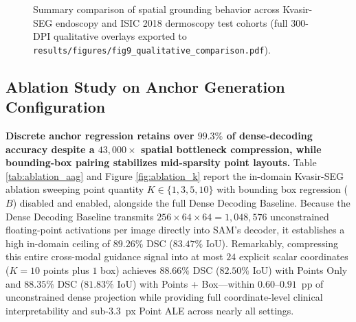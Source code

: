 \documentclass[onecolumn]{IEEEtran}
\numberwithin{equation}{section}
\theoremstyle{definition}
\theoremstyle{remark}
\begin{document}
{\begin{figure}[!htbp]
{%
}
\caption{Summary comparison of spatial grounding behavior across Kvasir-SEG endoscopy and ISIC 2018 dermoscopy test cohorts (full 300-DPI qualitative overlays exported to \texttt{results/figures/fig9\_qualitative\_comparison.pdf}).}
\label{fig:qualitative_comparison}
\end{figure}
}

\subsection{Ablation Study on Anchor Generation Configuration}

\textbf{Discrete anchor regression retains over $99.3\%$ of dense-decoding accuracy despite a $43{,}000\times$ spatial bottleneck compression, while bounding-box pairing stabilizes mid-sparsity point layouts.} Table \ref{tab:ablation_aag} and Figure \ref{fig:ablation_k} report the in-domain Kvasir-SEG ablation sweeping point quantity $K \in \{1, 3, 5, 10\}$ with bounding box regression ($B$) disabled and enabled, alongside the full Dense Decoding Baseline. Because the Dense Decoding Baseline transmits $256 \times 64 \times 64 = 1{,}048{,}576$ unconstrained floating-point activations per image directly into SAM's decoder, it establishes a high in-domain ceiling of $89.26\%$ DSC ($83.47\%$ IoU). Remarkably, compressing this entire cross-modal guidance signal into at most $24$ explicit scalar coordinates ($K = 10$ points plus $1$ box) achieves $88.66\%$ DSC ($82.50\%$ IoU) with Points Only and $88.35\%$ DSC ($81.83\%$ IoU) with Points + Box—within $0.60$--$0.91$~pp of unconstrained dense projection while providing full coordinate-level clinical interpretability and sub-$3.3$~px Point ALE across nearly all settings.
\end{document}

